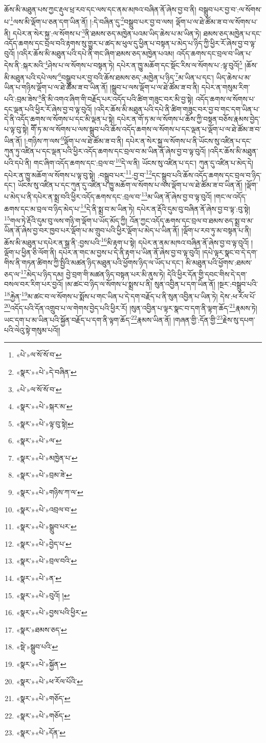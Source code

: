 ཆོས་མི་མཐུན་པས་ཀྱང་རྡུལ་ཕྲ་རབ་དང་ལས་དང་ནམ་མཁའ་བཞིན་ནོ་ཞེས་བྱ་བ་ནི། བསྒྲུབ་པར་བྱ་བ་:ལ་སོགས་པ་\footnote{«པེ་»ལ་སོ་སོ་བ་}ལས་མི་ལྡོག་པ་ཅན་དག་ཡིན་ནོ། །:དེ་བཞིན་དུ་\footnote{«སྣར་»«པེ་»དེ་བཞིན་}བསྒྲུབ་པར་བྱ་བ་ལས། ལྡོག་པ་ལ་ཐེ་ཚོམ་ཟ་བ་ལ་སོགས་པ་ནི། དཔེར་ན་སེར་སྐྱ་:ལ་སོགས་པ་\footnote{«པེ་»ལ་སོ་སོ་བ་}ནི་ཐམས་ཅད་མཁྱེན་པའམ་ཡིད་ཆེས་པ་མ་ཡིན་ཏེ། ཐམས་ཅད་མཁྱེན་པ་དང་འདོད་ཆགས་དང་བྲལ་བའི་རྟགས་སུ་གྱུར་པ་ཚད་མ་ཕུལ་དུ་ཕྱིན་པ་བསྟན་པ་མེད་པ་ཉིད་ཀྱི་ཕྱིར་རོ་ཞེས་བྱ་བ་ལྟ་བུའོ། །འདིར་ཆོས་མི་མཐུན་པའི་དཔེ་ནི་གང་ཞིག་ཐམས་ཅད་མཁྱེན་པའམ། འདོད་ཆགས་དང་བྲལ་བ་ཡིན་པ་དེས་ནི་:སྐར་མའི་\footnote{«སྣར་»«པེ་»སྐར་མ་}ཤེས་པ་ལ་སོགས་པ་བསྟན་ཏེ། དཔེར་ན་ཁྱུ་མཆོག་དང་སྡོང་རིས་ལ་སོགས་པ་:ལྟ་བུའོ།\footnote{«སྣར་»«པེ་»ལྟ་བུ་སྟེ།} །ཆོས་མི་མཐུན་པའི་དཔེ་ལས་\footnote{«སྣར་»«པེ་»ལ་}བསྒྲུབ་པར་བྱ་བའི་ཆོས་ཐམས་ཅད་:མཁྱེན་པ་ཉིད་\footnote{«སྣར་»«པེ་»མཁྱེན་པ་}མ་ཡིན་པ་དང་། ཡིད་ཆེས་པ་མ་ཡིན་པ་གཉིས་ལྡོག་པ་ལ་ཐེ་ཚོམ་ཟ་བ་ཡིན་ནོ། །སྒྲུབ་པ་ལས་ལྡོག་པ་ལ་ཐེ་ཚོམ་ཟ་བ་ནི། དཔེར་ན་གསུམ་རིག་པའི་:བྲམ་ཟེས་\footnote{«སྣར་»«པེ་»བྲམ་ཟེ་}ནི་མི་འགའ་ཞིག་གི་བརྗོད་པར་འདོད་པའི་ཚིག་གཟུང་བར་མི་བྱ་སྟེ། འདོད་ཆགས་ལ་སོགས་པ་དང་ལྡན་པའི་ཕྱིར་རོ་ཞེས་བྱ་བ་ལྟ་བུའོ། །འདིར་ཆོས་མི་མཐུན་པའི་དཔེ་ནི་ཚིག་གཟུང་བར་བྱ་བ་གང་དག་ཡིན་པ་དེ་ནི་འདོད་ཆགས་ལ་སོགས་པ་དང་མི་ལྡན་པ་སྟེ། དཔེར་ན་གོ་ཏ་མ་ལ་སོགས་པ་ཆོས་ཀྱི་བསྟན་བཅོས་རྣམས་བྱེད་པ་ལྟ་བུ་སྟེ། གཽ་ཏ་མ་ལ་སོགས་པ་ལས་སྒྲུབ་པའི་ཆོས་འདོད་ཆགས་ལ་སོགས་པ་དང་ལྡན་པ་ལྡོག་པ་ལ་ཐེ་ཚོམ་ཟ་བ་ཡིན་ནོ། །:གཉིས་ཀ་ལས་\footnote{«སྣར་»«པེ་»གཉིས་ཀ་ལ་}ལྡོག་པ་ལ་ཐེ་ཚོམ་ཟ་བ་ནི། དཔེར་ན་སེར་སྐྱ་ལ་སོགས་པ་ནི་ཡོངས་སུ་འཛིན་པ་དང་ཀུན་ཏུ་འཛིན་པ་དང་ལྡན་པའི་ཕྱིར་འདོད་ཆགས་དང་བྲལ་བ་མ་ཡིན་ནོ་ཞེས་བྱ་བ་ལྟ་བུའོ། །འདིར་ཆོས་མི་མཐུན་པའི་དཔེ་ནི། གང་ཞིག་འདོད་ཆགས་དང་:བྲལ་བ་\footnote{«སྣར་»«པེ་»འབྲལ་བ་}དེ་ལ་ནི། ཡོངས་སུ་འཛིན་པ་དང་། ཀུན་དུ་འཛིན་པ་མེད་དེ། དཔེར་ན་ཁྱུ་མཆོག་ལ་སོགས་པ་ལྟ་བུ་སྟེ། :བསྒྲུབ་པར་\footnote{«སྣར་»«པེ་»སྒྲུབ་པར་}:བྱ་བ་\footnote{«སྣར་»«པེ་»བྱེད་པ་}དང་སྒྲུབ་པའི་ཆོས་འདོད་ཆགས་དང་བྲལ་བ་ཉིད་དང་། ཡོངས་སུ་འཛིན་པ་དང་ཀུན་དུ་འཛིན་པ་ཁྱུ་མཆོག་ལ་སོགས་པ་ལས་ལྡོག་པ་ལ་ཐེ་ཚོམ་ཟ་བ་ཡིན་ནོ། །ལྡོག་པ་མེད་པ་ནི་དཔེར་ན་སྨྲ་བའི་ཕྱིར་འདོད་ཆགས་དང་:བྲལ་བ་\footnote{«སྣར་»«པེ་»བྲལ་བའི་}མ་ཡིན་ནོ་ཞེས་བྱ་བ་ལྟ་བུའོ། །གང་ལ་འདོད་ཆགས་དང་མ་བྲལ་བ་ཉིད་མེད་པ་\footnote{«སྣར་»«པེ་»ན་}དེ་ནི་སྨྲ་བ་མ་ཡིན་ཏེ། དཔེར་ན་རྡོའི་དུམ་བུ་བཞིན་ནོ་ཞེས་བྱ་བ་ལྟ་:བུ་སྟེ། \footnote{«སྣར་»«པེ་»བུའོ། ། }གལ་ཏེ་རྡོའི་དུམ་བུ་ལས་གཉི་ག་ལྡོག་པ་ཡོད་མོད་ཀྱི། འོན་ཀྱང་འདོད་ཆགས་དང་བྲལ་བ་ཐམས་ཅད་སྨྲ་བ་མ་ཡིན་ནོ་ཞེས་བྱ་བར་ཁྱབ་པར་ལྡོག་པ་མ་གྲུབ་པའི་ཕྱིར་ལྡོག་པ་མེད་པ་ཡིན་ནོ། །ལྡོག་པ་རབ་ཏུ་མ་བསྟན་པ་ནི། ཆོས་མི་མཐུན་པ་དཔེར་ན་སྒྲ་ནི་:བྱས་པའི་\footnote{«སྣར་»«པེ་»བྱས་པའི་ཕྱིར་}མི་རྟག་པ་སྟེ། དཔེར་ན་ནམ་མཁའ་བཞིན་ནོ་ཞེས་བྱ་བ་ལྟ་བུའོ། །ལྡོག་པ་ཕྱིན་ཅི་ལོག་ནི། དཔེར་ན་གང་མ་བྱས་པ་དེ་ནི་རྟག་པ་ཡིན་ནོ་ཞེས་བྱ་བ་ལྟ་བུའོ། །དཔེ་ལྟར་སྣང་བ་དེ་དག་གིས་ནི་གཏན་ཚིགས་ཀྱི་སྤྱིའི་མཚན་ཉིད་མཐུན་པའི་ཕྱོགས་ཉིད་ལ་ཡོད་པ་དང་། མི་མཐུན་པའི་ཕྱོགས་:ཐམས་ཅད་ལ་\footnote{«སྣར་»ཐམས་ཅད་}མེད་པ་ཉིད་དམ། བྱེ་བྲག་གི་མཚན་ཉིད་བསྟན་པར་མི་ནུས་ཏེ། དེའི་ཕྱིར་དོན་གྱི་དབང་གིས་དེ་དག་བསལ་བར་རིག་པར་བྱའོ། །མ་ཚང་བ་ཉིད་ལ་སོགས་པ་སྨྲས་པ་ནི། སུན་འབྱིན་པ་དག་ཡིན་ནོ། །སྔར་:བསྒྲུབ་པའི་\footnote{«སྡེ་»སྒྲུབ་པའི་}རྐྱེན་\footnote{«སྣར་»«པེ་»སྐྱོན་}མ་ཚང་བ་ལ་སོགས་པ་སྨོས་པ་གང་ཡིན་པ་དེ་དག་བརྗོད་པ་ནི་སུན་འབྱིན་པ་ཡིན་ཏེ། དེས་:ཕ་རོལ་པོ་\footnote{«སྣར་»«པེ་»ཕ་རོལ་པོའི་}འདོད་པའི་དོན་འགྲུབ་པ་ལ་གེགས་བྱེད་པའི་ཕྱིར་རོ། །སུན་འབྱིན་པ་ལྟར་སྣང་བ་དག་ནི་ལྟག་ཆོད་\footnote{«སྣར་»«པེ་»གཅོད་}རྣམས་ཏེ། ཡང་དག་པ་མ་ཡིན་པའི་སྐྱོན་བརྗོད་པ་དག་ནི་ལྟག་ཆོད་\footnote{«སྣར་»«པེ་»གཅོད་}རྣམས་ཡིན་ནོ། །གཞན་གྱི་:དོན་གྱི་\footnote{«སྣར་»«པེ་»དོན་}རྗེས་སུ་དཔག་པའི་ལེའུ་སྟེ་གསུམ་པའོ།། 